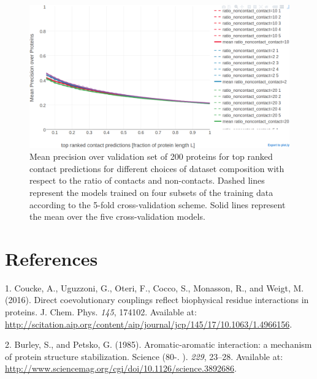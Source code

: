 \documentclass[12pt,a4paper,twoside]{book}
\theoremstyle{definition}
\theoremstyle{definition}
\theoremstyle{remark}
\begin{document}
\begin{figure}

{\centering \includegraphics[width=0.9\linewidth]{img/random_forest_contact_prior/cross_validation/precision_vs_rank_cv_on_test_random_forest_nestimators1000_maxfeatureslog2_maxdepth10_minsamplesleaf100_ratio} 

}

\caption{Mean precision over
validation set of 200 proteins for top ranked contact predictions for
different choices of dataset composition with respect to the ratio of
contacts and non-contacts. Dashed lines represent the models trained on
four subsets of the training data according to the 5-fold
cross-validation scheme. Solid lines represent the mean over the five
cross-validation models.}\label{fig:random-forest-rationoncontactthr-cv}
\end{figure}

\backmatter

\listoffigures
{}

\listoftables
{}

\chapter*{References}\label{references}

\hypertarget{refs}{}
\hypertarget{ref-Coucke2016}{}
1. Coucke, A., Uguzzoni, G., Oteri, F., Cocco, S., Monasson, R., and
Weigt, M. (2016). Direct coevolutionary couplings reflect biophysical
residue interactions in proteins. J. Chem. Phys. \emph{145}, 174102.
Available at:
\url{http://scitation.aip.org/content/aip/journal/jcp/145/17/10.1063/1.4966156}.

\hypertarget{ref-Burley1985}{}
2. Burley, S., and Petsko, G. (1985). Aromatic-aromatic interaction: a
mechanism of protein structure stabilization. Science (80-. ).
\emph{229}, 23--28. Available at:
\url{http://www.sciencemag.org/cgi/doi/10.1126/science.3892686}.
\end{document}
